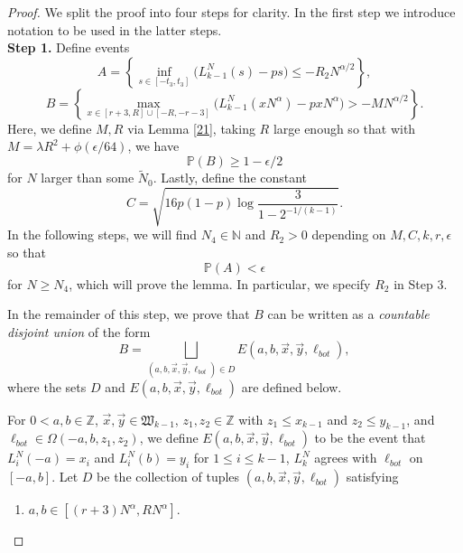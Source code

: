 	\begin{proof} We split the proof into four steps for clarity. In the first step we introduce notation to be used in the latter steps.\\
	
	\noindent\textbf{Step 1.} Define events
		\[
		A = \left\{\inf_{s \in [ -t_3, t_3 ]}\big(L^N_{k-1}(s) - p s \big) \leq - R_2N^{\alpha/2}\right\},
		\]
		\[
		B = \left\{ \max_{x\in [r+3, R] \cup [-R,-r-3]} \big(L^N_{k-1}(xN^\alpha) - pxN^\alpha\big) > -MN^{\alpha/2} \right\}.
		\]
		Here, we define $M,R$ via Lemma \ref{21}, taking $R$ large enough so that with $M = \lambda R^2 + \phi(\epsilon/64)$, we have 
		\begin{equation}\label{4.3Bbound}
		\mathbb{P}(B) \geq 1 - \epsilon/2
		\end{equation} 
		for $N$ larger than some $\tilde{N}_0$.
		Lastly, define the constant
		\begin{equation}\label{4.3Cdef}
		C = \sqrt{16p(1-p)\log\frac{3}{1-2^{-1/(k-1)}}}.
		\end{equation}
		In the following steps, we will find $N_4\in\mathbb{N}$ and $R_2 > 0$ depending on $M,C,k,r,\epsilon$ so that 
		\begin{equation}\label{4.3Abound}
		\mathbb{P}(A) < \epsilon
		\end{equation}
		for $N\geq N_4$, which will prove the lemma. In particular, we specify $R_2$ in Step 3.
		
		In the remainder of this step, we prove that $B$ can be written as a \textit{countable disjoint union} of the form
		\begin{equation}\label{4.3disj}
		B = \bigsqcup_{(a,b,\vec{x},\vec{y},\ell_{bot})\in D} E(a,b,\vec{x},\vec{y},\ell_{bot}),
		\end{equation}
		where the sets $D$ and $E(a,b,\vec{x},\vec{y},\ell_{bot})$ are defined below.
		
		For $0<a,b\in\mathbb{Z}$, $\vec{x},\vec{y}\in\mathfrak{W}_{k-1}$, $z_1,z_2\in\mathbb{Z}$ with $z_1\leq x_{k-1}$ and $z_2\leq y_{k-1}$, and $\ell_{bot}\in\Omega(-a,b,z_1,z_2)$, we define $E(a,b,\vec{x},\vec{y},\ell_{bot})$ to be the event that $L_i^N(-a) = x_i$ and $L_i^N(b) = y_i$ for $1\leq i\leq k-1$, $L_k^N$ agrees with $\ell_{bot}$ on $[-a,b]$. Let $D$ be the collection of tuples $(a,b,\vec{x},\vec{y},\ell_{bot})$ satisfying 
		\begin{enumerate}[label=(\arabic*)]
			
			\item $a,b\in[(r+3)N^\alpha,RN^\alpha]$.
			

\end{enumerate}
\end{proof}
